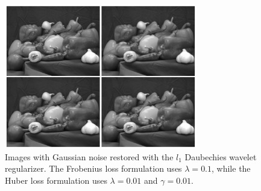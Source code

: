 \documentclass[10pt,a4paper]{article}
\begin{document}
	\begin{figure}[H]
		\begin{center}
			\includegraphics[width = 0.75\textwidth]{../figures/waveletGaussD.pdf} 
		\end{center}
		\caption{Images with Gaussian noise restored with the $l_1$ Daubechies wavelet regularizer. The Frobenius loss formulation uses $\lambda = 0.1$, while the Huber loss formulation uses $\lambda = 0.01$ and $\gamma = 0.01$. }
		\label{waveletD_gauss}
	\end{figure}
	
\end{document}
